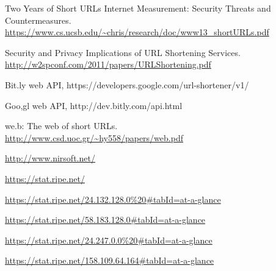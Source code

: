 \documentclass[12pt]{article}
\begin{document}
\begin{thebibliography}{99}
Two Years of Short URLs Internet Measurement: Security Threats and Countermeasures. \\ \url{https://www.cs.ucsb.edu/~chris/research/doc/www13_shortURLs.pdf}

Security and Privacy Implications of URL Shortening Services. \\ \url{http://w2spconf.com/2011/papers/URLShortening.pdf}

Bit.ly web API, https://developers.google.com/url-shortener/v1/

Goo,gl web API, http://dev.bitly.com/api.html

we.b: The web of short URLs. \\ \url{http://www.csd.uoc.gr/~hy558/papers/web.pdf}

\url{http://www.nirsoft.net/}

\url{https://stat.ripe.net/}

\url{https://stat.ripe.net/24.132.128.0%20#tabId=at-a-glance}

\url{https://stat.ripe.net/58.183.128.0#tabId=at-a-glance}

\url{https://stat.ripe.net/24.247.0.0%20#tabId=at-a-glance}

\url{https://stat.ripe.net/158.109.64.164#tabId=at-a-glance}


\end{thebibliography}

\newpage
\end{document}
